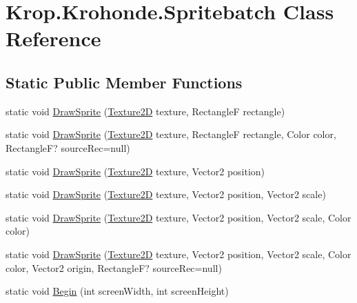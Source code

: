 \hypertarget{class_krop_1_1_krohonde_1_1_spritebatch}{}\section{Krop.\+Krohonde.\+Spritebatch Class Reference}
\label{class_krop_1_1_krohonde_1_1_spritebatch}
\subsection*{Static Public Member Functions}
\begin{DoxyCompactItemize}
\item 
static void \mbox{\hyperlink{class_krop_1_1_krohonde_1_1_spritebatch_af312141beabae3816e190343bb63b1ee}{Draw\+Sprite}} (\mbox{\hyperlink{class_krop_1_1_krohonde_1_1_texture2_d}{Texture2D}} texture, RectangleF rectangle)
\item 
static void \mbox{\hyperlink{class_krop_1_1_krohonde_1_1_spritebatch_a0edfdfb7ac4997f89578c617b2f9da53}{Draw\+Sprite}} (\mbox{\hyperlink{class_krop_1_1_krohonde_1_1_texture2_d}{Texture2D}} texture, RectangleF rectangle, Color color, RectangleF? source\+Rec=null)
\item 
static void \mbox{\hyperlink{class_krop_1_1_krohonde_1_1_spritebatch_a6e80cba942888ba405410ce5361b550c}{Draw\+Sprite}} (\mbox{\hyperlink{class_krop_1_1_krohonde_1_1_texture2_d}{Texture2D}} texture, Vector2 position)
\item 
static void \mbox{\hyperlink{class_krop_1_1_krohonde_1_1_spritebatch_ab4a2ef07acfe42c03b8de094bd499197}{Draw\+Sprite}} (\mbox{\hyperlink{class_krop_1_1_krohonde_1_1_texture2_d}{Texture2D}} texture, Vector2 position, Vector2 scale)
\item 
static void \mbox{\hyperlink{class_krop_1_1_krohonde_1_1_spritebatch_a1c7dd22c521c29636044af5194c846a0}{Draw\+Sprite}} (\mbox{\hyperlink{class_krop_1_1_krohonde_1_1_texture2_d}{Texture2D}} texture, Vector2 position, Vector2 scale, Color color)
\item 
static void \mbox{\hyperlink{class_krop_1_1_krohonde_1_1_spritebatch_a68b5800b1626fa035e66b7b40badc245}{Draw\+Sprite}} (\mbox{\hyperlink{class_krop_1_1_krohonde_1_1_texture2_d}{Texture2D}} texture, Vector2 position, Vector2 scale, Color color, Vector2 origin, RectangleF? source\+Rec=null)
\item 
static void \mbox{\hyperlink{class_krop_1_1_krohonde_1_1_spritebatch_acee872767762886ac0b07fd3f645205e}{Begin}} (int screen\+Width, int screen\+Height)
\end{DoxyCompactItemize}


